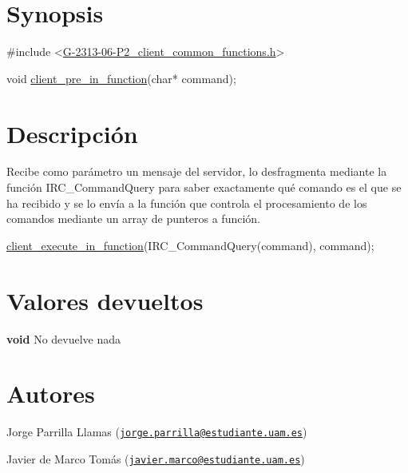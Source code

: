 \hypertarget{client_pre_in_function_synopsis_3}{}\section{Synopsis}\label{client_pre_in_function_synopsis_3}

\begin{DoxyCode}
\textcolor{preprocessor}{#include <\hyperlink{G-2313-06-P2__client__common__functions_8h}{G-2313-06-P2\_client\_common\_functions.h}>}

\textcolor{keywordtype}{void} \hyperlink{G-2313-06-P2__client_8h_aa74c686c447b275e6a8cf36419033e81}{client\_pre\_in\_function}(\textcolor{keywordtype}{char}* command);
\end{DoxyCode}
 \hypertarget{client_pre_in_function_descripcion_3}{}\section{Descripción}\label{client_pre_in_function_descripcion_3}
Recibe como parámetro un mensaje del servidor, lo desfragmenta mediante la función I\+R\+C\+\_\+\+Command\+Query para saber exactamente qué comando es el que se ha recibido y se lo envía a la función que controla el procesamiento de los comandos mediante un array de punteros a función. 
\begin{DoxyCode}
\hyperlink{G-2313-06-P2__client_8h_a6dd72e0b56b87f85d8cac2a30066198b}{client\_execute\_in\_function}(IRC\_CommandQuery(command), command);
\end{DoxyCode}
\hypertarget{client_pre_in_function_return_3}{}\section{Valores devueltos}\label{client_pre_in_function_return_3}

\begin{DoxyItemize}
\item {\bfseries void} No devuelve nada 
\end{DoxyItemize}\hypertarget{client_pre_in_function_authors_3}{}\section{Autores}\label{client_pre_in_function_authors_3}

\begin{DoxyItemize}
\item Jorge Parrilla Llamas (\href{mailto:jorge.parrilla@estudiante.uam.es}{\tt jorge.\+parrilla@estudiante.\+uam.\+es}) 
\item Javier de Marco Tomás (\href{mailto:javier.marco@estudiante.uam.es}{\tt javier.\+marco@estudiante.\+uam.\+es}) 
\end{DoxyItemize}